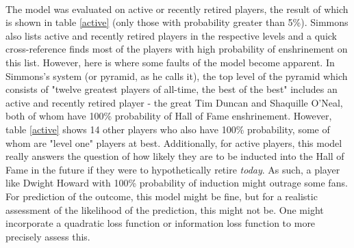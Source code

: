 \documentclass[paper=a4, fontsize=11pt]{scrartcl} %
\numberwithin{equation}{section} %
\numberwithin{figure}{section} %
\numberwithin{table}{section} %
\begin{document}
\\
The model was evaluated on active or recently retired players, the result of which is shown in table \ref{active} (only those with probability greater than 5\%). Simmons also lists active and recently retired players in the respective levels and a quick cross-reference finds most of the players with high probability of enshrinement on this list. However, here is where some faults of the model become apparent. In Simmons's system (or pyramid, as he calls it), the top level of the pyramid which consists of "twelve greatest players of all-time, the best of the best" includes an active and recently retired player - the great Tim Duncan and Shaquille O'Neal, both of whom have 100\% probability of Hall of Fame enshrinement. However, table \ref{active} shows 14 other players who also have 100\% probability, some of whom are "level one" players at best. Additionally, for active players, this model really answers the question of how likely they are to be inducted into the Hall of Fame in the future if they were to hypothetically retire \textit{today}. As such, a player like Dwight Howard with 100\% probability of induction might outrage some fans. For prediction of the outcome, this model might be fine, but for a realistic assessment of the likelihood of the prediction, this might not be. One might incorporate a quadratic loss function or information loss function to more precisely assess this.
\end{document}
